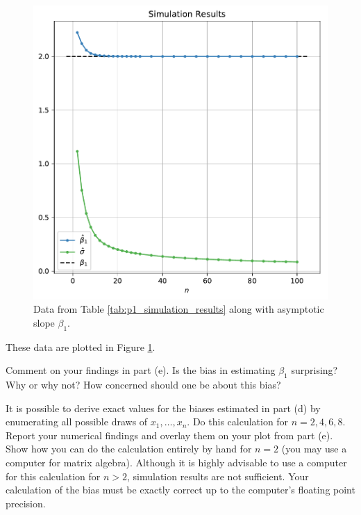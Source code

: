 \documentclass[11pt, letterpaper]{article}
\begin{document}
{\begin{enumerate}[(a)]
\begin{description}
  \begin{figure}
    \centering
    \includegraphics{p1_simulation_results.pdf}
    \caption{Data from Table \ref{tab:p1_simulation_results} along with
      asymptotic slope $\beta_1$.}
    \label{fig:p1_simulation_results}
  \end{figure}

  These data are plotted in Figure \ref{fig:p1_simulation_results}.
\end{description}

{\item Comment on your findings in part (e).  Is the bias in estimating $\beta_1$ surprising?  Why or why not?  How concerned should one be about this bias? }
{\item It is possible to derive exact values for the biases estimated in part (d) by enumerating all possible draws of $x_1, \ldots, x_n$.  Do this calculation for $n=2,4,6,8$.  Report your numerical findings and overlay them on your plot from part (e).   Show how you can do the calculation entirely by hand for $n=2$ (you may use a computer for matrix algebra).  Although it is highly advisable to use a computer for this calculation for $n>2$, simulation results are not sufficient.  Your calculation of the bias must be exactly correct up to the computer's floating point precision.}
\end{enumerate}



}
\end{document}

